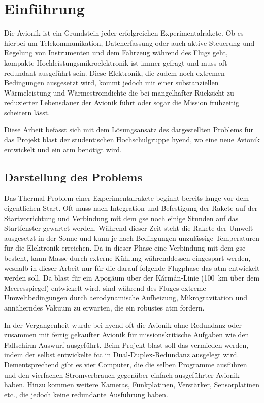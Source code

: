 \chapter{Einführung}			
\label{sec:Introduction}


Die Avionik ist ein Grundstein jeder erfolgreichen Experimentalrakete. Ob es hierbei um Telekommunikation,
Datenerfassung oder auch aktive Steuerung und Regelung von
Instrumenten und dem Fahrzeug während des Flugs geht, kompakte Hochleistungsmikroelektronik ist immer gefragt und muss oft redundant ausgeführt sein.
Diese Elektronik, die zudem noch extremen Bedingungen ausgesetzt wird, kommt jedoch mit einer
substanziellen Wärmeleistung und Wärmestromdichte die bei mangelhafter Rücksicht zu reduzierter Lebensdauer der Avionik führt
oder sogar die Mission frühzeitig scheitern lässt.

Diese Arbeit befasst sich mit dem Lösungsansatz des dargestellten Problems für das Projekt \ac{blast} der studentischen Hochschulgruppe \ac{hyend},
wo eine neue Avionik entwickelt und ein \ac{atm} benötigt wird.

\section{Darstellung des Problems}

Das Thermal-Problem einer Experimentalrakete beginnt bereits lange vor dem eigentlichen Start. Oft muss nach Integration und
Befestigung der Rakete auf der Startvorrichtung und Verbindung mit dem \ac{gse} noch einige Stunden auf das Startfenster gewartet werden.
Während dieser Zeit steht die Rakete der Umwelt ausgesetzt in der Sonne und kann je nach Bedingungen 
unzulässige Temperaturen für die Elektronik erreichen. Da in dieser Phase eine Verbindung mit dem 
\ac{gse} besteht, kann Masse durch externe Kühlung währenddessen eingespart werden, weshalb in dieser Arbeit nur für die darauf folgende 
Flugphase das \ac{atm} entwickelt werden soll.
Da \ac{blast} für ein Apogäum über der Kármán-Linie (\SI{100}{\kilo\meter} über dem Meeresspiegel) entwickelt wird, sind während des Fluges extreme Umweltbedingungen
durch aerodynamische Aufheizung, Mikrogravitation und annäherndes Vakuum zu erwarten, die ein robustes \ac{atm} fordern.

In der Vergangenheit wurde bei \ac{hyend} oft die Avionik ohne Redundanz oder zusammen mit fertig gekaufter Avionik für 
missionskritische Aufgaben wie den Fallschirm-Auswurf ausgeführt. Beim Projekt \ac{blast} soll das vermieden werden, 
indem der selbst entwickelte \ac{fcc} in Dual-Duplex-Redundanz ausgelegt wird. Dementsprechend gibt es vier Computer, die
die selben Programme ausführen und den vierfachen Stromverbrauch gegenüber einfach ausgeführter Avionik haben. Hinzu kommen
weitere Kameras, Funkplatinen, Verstärker, Sensorplatinen etc., die jedoch keine redundante Ausführung haben.

